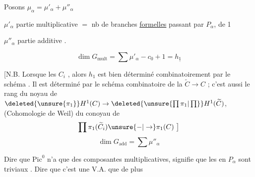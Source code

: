 Posons $\mu_\alpha=\mu'_\alpha+\mu''_\alpha$

$\mu'_\alpha$ partie multiplicative $=$ nb de branches \uline{formelles} passant par $P_\alpha$,   de 1

$\mu''_\alpha$ partie additive .

\[
\dim G_{\mathrm{mult}}=\sum\mu'_\alpha-c_0+1=h_{\underline{1}}
\]

[N.B. Lorsque les $C_i$ , alors $h_1$  est bien déterminé  combinatoirement par le schéma  . Il est  déterminé par le schéma combinatoire de la  $\widetilde C\to C$ ; c'est aussi le rang du  noyau de $\deleted{\unsure{\pi_1}}H^1(C)\to\deleted{\unsure{\prod\pi_1|\prod}}H^1(\widetilde C)$, (Cohomologie de Weil)  du conoyau de
\[
\prod\pi_1(\widetilde C_i)\unsure{-|\to}\pi_1(C)\ \big]
\]
\[
\dim G_{\mathrm{add}}=\sum\mu''_\alpha
\]

Dire que $\mathrm{Pic}^0$ n'a que des composantes  multiplicatives, signifie que les  en $P_\alpha$ sont triviaux . Dire que c'est une V.A.   que  de plus

